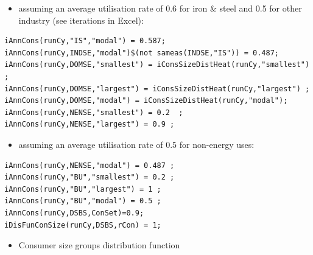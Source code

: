 \documentclass[a4paper,]{scrartcl}
\providecommand{\tightlist}{%
  \setlength{\itemsep}{0pt}\setlength{\parskip}{0pt}}
\begin{document}
\begin{itemize}
\tightlist
\item
  assuming an average utilisation rate of 0.6 for iron \& steel and 0.5
  for other industry (see iterations in Excel):
\end{itemize}

\begin{lstlisting}
iAnnCons(runCy,"IS","modal") = 0.587;
iAnnCons(runCy,INDSE,"modal")$(not sameas(INDSE,"IS")) = 0.487;
iAnnCons(runCy,DOMSE,"smallest") = iConsSizeDistHeat(runCy,"smallest")  ;
iAnnCons(runCy,DOMSE,"largest") = iConsSizeDistHeat(runCy,"largest") ;
iAnnCons(runCy,DOMSE,"modal") = iConsSizeDistHeat(runCy,"modal");
iAnnCons(runCy,NENSE,"smallest") = 0.2  ;
iAnnCons(runCy,NENSE,"largest") = 0.9 ;
\end{lstlisting}

\begin{itemize}
\tightlist
\item
  assuming an average utilisation rate of 0.5 for non-energy uses:
\end{itemize}

\begin{lstlisting}
iAnnCons(runCy,NENSE,"modal") = 0.487 ;
iAnnCons(runCy,"BU","smallest") = 0.2 ;
iAnnCons(runCy,"BU","largest") = 1 ;
iAnnCons(runCy,"BU","modal") = 0.5 ;
iAnnCons(runCy,DSBS,ConSet)=0.9;
iDisFunConSize(runCy,DSBS,rCon) = 1;
\end{lstlisting}

\begin{itemize}
\tightlist
\item
  Consumer size groups distribution function
\end{itemize}
\end{document}
